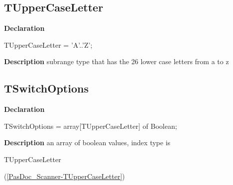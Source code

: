\documentclass{report}
\newif\ifpdf
\begin{document}
\subsection*{TUpperCaseLetter}
\fi
\label{PasDoc_Scanner-TUpperCaseLetter}
\begin{list}{}{
\setlength{\itemindent}{0cm}
\setlength{\listparindent}{0cm}
\setlength{\leftmargin}{\evensidemargin}
\addtolength{\leftmargin}{\tmplength}
\settowidth{\labelsep}{X}
\addtolength{\leftmargin}{\labelsep}
\setlength{\labelwidth}{\tmplength}
}
\item[\textbf{Declaration}\hfill]
\ifpdf
\begin{flushleft}
\fi
\begin{ttfamily}
TUpperCaseLetter = 'A'..'Z';\end{ttfamily}

\ifpdf
\end{flushleft}
\fi

\par
\item[\textbf{Description}]
subrange type that has the 26 lower case letters from a to z

\end{list}
\ifpdf
\subsection*{\large{\textbf{TSwitchOptions}}\normalsize\hspace{1ex}\hrulefill}
\else
\subsection*{TSwitchOptions}
\fi
\label{PasDoc_Scanner-TSwitchOptions}
\begin{list}{}{
\setlength{\itemindent}{0cm}
\setlength{\listparindent}{0cm}
\setlength{\leftmargin}{\evensidemargin}
\addtolength{\leftmargin}{\tmplength}
\settowidth{\labelsep}{X}
\addtolength{\leftmargin}{\labelsep}
\setlength{\labelwidth}{\tmplength}
}
\item[\textbf{Declaration}\hfill]
\ifpdf
\begin{flushleft}
\fi
\begin{ttfamily}
TSwitchOptions = array[TUpperCaseLetter] of Boolean;\end{ttfamily}

\ifpdf
\end{flushleft}
\fi

\par
\item[\textbf{Description}]
an array of boolean values, index type is \begin{ttfamily}TUpperCaseLetter\end{ttfamily}(\ref{PasDoc_Scanner-TUpperCaseLetter})

\end{list}
\ifpdf
\end{document}
